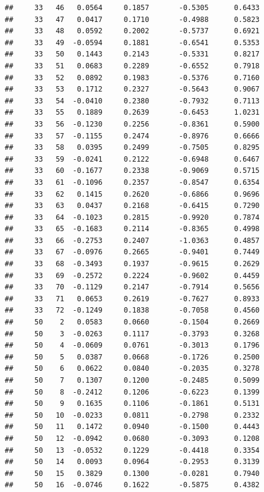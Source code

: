 \documentclass[
]{article}
\begin{document}
\begin{verbatim}
##     33   46   0.0564     0.1857       -0.5305      0.6433  
##     33   47   0.0417     0.1710       -0.4988      0.5823  
##     33   48   0.0592     0.2002       -0.5737      0.6921  
##     33   49  -0.0594     0.1881       -0.6541      0.5353  
##     33   50   0.1443     0.2143       -0.5331      0.8217  
##     33   51   0.0683     0.2289       -0.6552      0.7918  
##     33   52   0.0892     0.1983       -0.5376      0.7160  
##     33   53   0.1712     0.2327       -0.5643      0.9067  
##     33   54  -0.0410     0.2380       -0.7932      0.7113  
##     33   55   0.1889     0.2639       -0.6453      1.0231  
##     33   56  -0.1230     0.2256       -0.8361      0.5900  
##     33   57  -0.1155     0.2474       -0.8976      0.6666  
##     33   58   0.0395     0.2499       -0.7505      0.8295  
##     33   59  -0.0241     0.2122       -0.6948      0.6467  
##     33   60  -0.1677     0.2338       -0.9069      0.5715  
##     33   61  -0.1096     0.2357       -0.8547      0.6354  
##     33   62   0.1415     0.2620       -0.6866      0.9696  
##     33   63   0.0437     0.2168       -0.6415      0.7290  
##     33   64  -0.1023     0.2815       -0.9920      0.7874  
##     33   65  -0.1683     0.2114       -0.8365      0.4998  
##     33   66  -0.2753     0.2407       -1.0363      0.4857  
##     33   67  -0.0976     0.2665       -0.9401      0.7449  
##     33   68  -0.3493     0.1937       -0.9615      0.2629  
##     33   69  -0.2572     0.2224       -0.9602      0.4459  
##     33   70  -0.1129     0.2147       -0.7914      0.5656  
##     33   71   0.0653     0.2619       -0.7627      0.8933  
##     33   72  -0.1249     0.1838       -0.7058      0.4560  
##     50    2   0.0583     0.0660       -0.1504      0.2669  
##     50    3  -0.0263     0.1117       -0.3793      0.3268  
##     50    4  -0.0609     0.0761       -0.3013      0.1796  
##     50    5   0.0387     0.0668       -0.1726      0.2500  
##     50    6   0.0622     0.0840       -0.2035      0.3278  
##     50    7   0.1307     0.1200       -0.2485      0.5099  
##     50    8  -0.2412     0.1206       -0.6223      0.1399  
##     50    9   0.1635     0.1106       -0.1861      0.5131  
##     50   10  -0.0233     0.0811       -0.2798      0.2332  
##     50   11   0.1472     0.0940       -0.1500      0.4443  
##     50   12  -0.0942     0.0680       -0.3093      0.1208  
##     50   13  -0.0532     0.1229       -0.4418      0.3354  
##     50   14   0.0093     0.0964       -0.2953      0.3139  
##     50   15   0.3829     0.1300       -0.0281      0.7940  
##     50   16  -0.0746     0.1622       -0.5875      0.4382  

\end{verbatim}
\end{document}

